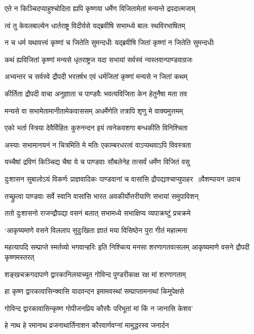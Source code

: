 \twolineshloka
{एते न किञ्चिदप्याहुश्चोदिता ह्यपि कृष्णया}
{धर्मेण विजितामेतां मन्यन्ते द्रपदात्मजाम्}


\twolineshloka
{त्वं तु केवलबाल्येन धार्तराष्ट्र विदीर्यसे}
{यद्ब्रवीषि सभाम्ध्ये बालः स्थविरभाषितम्}


\twolineshloka
{न च धर्म यथावत्त्वं कृष्णां च जितेति सुमन्दधीः}
{यद्ब्रवीषि जितां कृष्णां न जितेति सुमन्दधीः}


\twolineshloka
{कथं ह्यविजितां कृष्णां मन्यसे धृतराष्ट्रज}
{यदा सभायां सर्वस्वं न्यस्तवान्पाण्डवाग्रजः}


\twolineshloka
{अभ्यन्तर च सर्वस्वे द्रौपदी भरतर्षभ}
{एवं धर्मजितां कृष्णां मन्यसे न जितां कथम्}


\twolineshloka
{कीर्तिता द्रौपदी वाचा अनुज्ञाता च पाण्डवैः}
{भवत्यविजिता केन हेतुनैषा मता तव}


\twolineshloka
{मन्यसे वा सभामेतामानीतामेकवाससम्}
{अधर्मेणेति तत्रापि शृणु मे वाक्यमुत्तमम्}


\twolineshloka
{एको भर्ता स्त्रिया देवैर्विहितः कुरुनन्दन}
{इयं त्वनेकवशगा बन्धकीति विनिश्चिता}


\twolineshloka
{अस्याः सभामानयनं न चित्रमिति मे मतिः}
{एकाम्बरधरत्वं वाऽप्यथवाऽपि विवस्त्रता}


\twolineshloka
{यच्चैषां द्रविणं किञ्चिद्य चैषा ये च पाण्डवाः}
{सौबलेनेह तत्सर्वं धर्मेण विजितं वसु}


\twolineshloka
{दुःशासन सुबालोऽयं विकर्णः प्राज्ञवादिकः}
{पाण्डवानां च वासांसि द्रौपद्याश्चाप्युपाहर ॥वैशम्पायन उवाच}


\twolineshloka
{तच्छ्रुत्वा पाण्डवाः सर्वे स्वानि वासांसि भारत}
{अवकीर्योत्तरीयाणि सभायां समुपाविशन्}


\twolineshloka
{ततो दुःशासनो राजन्द्रौपद्या वसनं बलात्}
{सभामध्ये सभाक्षिप्य व्यपाक्रष्टुं प्रचक्रमे}


\twolineshloka
{`आकृष्यमाणे वसने विललाप सुदुःखिता}
{ज्ञातं मया विसिष्ठेन पुरा गीतं महात्मना}


\threelineshloka
{महत्यापदि सम्प्राप्ते स्मर्तव्यो भगवान्हरिः}
{इति निश्चित्य मनसा शरणागतवत्सलम्}
{आकृष्यमाणे वसने द्रौपदी कृष्णमस्तरत्}


\twolineshloka
{शङ्खचक्रगदापाणे द्वारकानिलयाच्युत}
{गोविन्द पुण्डरीकाक्ष रक्ष मां शरणागताम्}


\twolineshloka
{हा कृष्ण द्वारकावासिन्क्वासि यादवन्दन}
{इमामवस्थां सम्प्राप्तामनाथां किमुपेक्षसे}


\twolineshloka
{गोविन्द द्वारकावासिन्कृष्ण गोपीजनप्रिय}
{कौरवैः परिभूतां मां किं न जानासि केशव'}


\twolineshloka
{हे नाथ हे रमानाथ व्रजनाथार्तिनाशन}
{कौरवार्णवग्नां मामुद्धरस्व जनार्दन}


